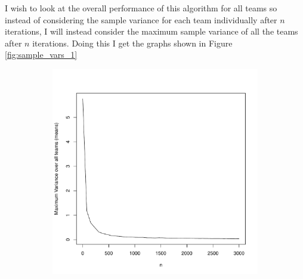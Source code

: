 \documentclass[11pt]{article} %
\begin{document}
I wish to look at the overall performance of this algorithm for all teams so instead of considering the sample variance for each team individually after $n$ iterations, I will instead consider the maximum sample variance of all the teams after $n$ iterations. Doing this I get the graphs shown in Figure \ref{fig:sample_vars_1}%
\begin{figure}[h]
	\centering
	\begin{subfigure}{0.48\textwidth}
		\centering
		\includegraphics[width=1.0\textwidth]{"../R File/var_means"}
	\end{subfigure}%
	\hspace{0.04\textwidth}%
	\begin{subfigure}{0.48\textwidth}
		\centering

\end{subfigure}
\end{figure}
\end{document}
